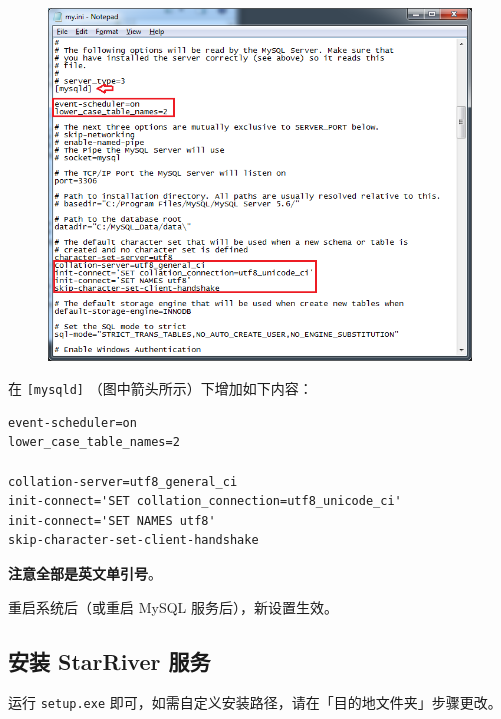 \begin{figure}[htbp]
\centering
\includegraphics{img/my_ini.png}
\caption{}
\end{figure}

在 \texttt{{[}mysqld{]}} （图中箭头所示）下增加如下内容：

\begin{verbatim}
event-scheduler=on
lower_case_table_names=2

collation-server=utf8_general_ci
init-connect='SET collation_connection=utf8_unicode_ci'
init-connect='SET NAMES utf8'
skip-character-set-client-handshake
\end{verbatim}

\textbf{注意全部是英文单引号\texttt{\textquotesingle{}}}。

重启系统后（或重启 MySQL 服务后），新设置生效。

\subsection{安装 StarRiver
服务}\label{ux5b89ux88c5-starriver-ux670dux52a1}

运行 \texttt{setup.exe}
即可，如需自定义安装路径，请在「目的地文件夹」步骤更改。

